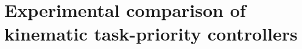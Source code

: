 \documentclass[../main.tex]{subfiles}
\begin{document}
\chapter{Experimental comparison of kinematic task-priority controllers}

\end{document}

